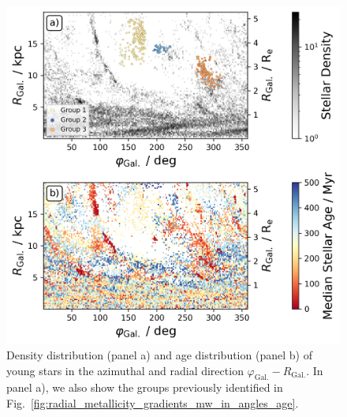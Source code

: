 \documentclass[twocolumn,apj,numberedappendix,appendixfloats,twocolappendix]{openjournal}
\begin{document}
\begin{CJK*}{UTF8}{gbsn}
\begin{figure}
    \centering
    \includegraphics[width=\columnwidth]{figures/phi_angle_R_follow_up.png}
    \caption{Density distribution (panel a) and age distribution (panel b) of young stars in the azimuthal and radial direction $\varphi_\mathrm{Gal.}-R_\mathrm{Gal.}$. In panel a), we also show the groups previously identified in Fig.~\ref{fig:radial_metallicity_gradients_mw_in_angles_age}.}
    \label{fig:phi_angle_R_follow_up}
\end{figure}


\end{CJK*}
\end{document}
